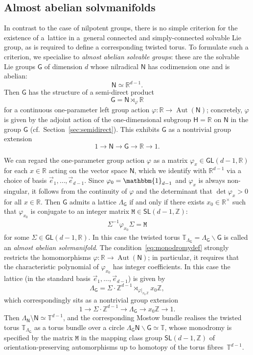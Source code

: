 \documentclass[10pt,a4paper]{amsart}
\numberwithin{equation}{section}
\newcommand{\unit}{\mathbbm{1}} 			%
\newcommand{\sfG}{\mathsf{G}}
\newcommand{\sfH}{\mathsf{H}}
\newcommand{\sfN}{\mathsf{N}}
\newcommand{\sfGL}{\mathsf{GL}}
\newcommand{\sfSL}{\mathsf{SL}}
\newcommand{\ttM}{\mathtt{M}}
\newcommand{\Aut}{\operatorname{Aut}}
\newcommand{\R}{\real}
\newcommand{\zed}{{\mathbb Z}} %
\newcommand{\real}{{\mathbb R}} %
\newcommand{\torus}{{\mathbb T}} %
\begin{document}
\subsection{Almost abelian solvmanifolds}\label{sec:abeliansolv}

In contrast to the case of nilpotent groups, there is no
simple criterion for the existence of a~lattice in a~general
connected and simply-connected solvable Lie group, as is required to define a corresponding twisted
torus. To formulate such a criterion, we specialise to \emph{almost
abelian solvable groups}: these are the solvable Lie groups $\sfG$ of
dimension $d$
whose nilradical $\sfN$ has codimension one and is abelian:
\[
\sfN \simeq \real^{d-1} .
\]
Then $\sfG$ has the
structure of a semi-direct product
\[
\sfG = \sfN\rtimes_\varphi\real
\]
for a continuous one-parameter left group action
$\varphi\colon \real\to\Aut(\sfN)$; concretely, $\varphi$ is given by the
adjoint action of the one-dimensional subgroup $\sfH=\real$ on $\sfN$
in the group $\sfG$ (cf.~Section~\ref{sec:semidirect}). This exhibits
$\sfG$ as a nontrivial group extension
\[
1\longrightarrow \sfN \longrightarrow \sfG \longrightarrow \R \longrightarrow 1 .
\]

We can regard the one-parameter group action $\varphi$ as a matrix
$\varphi_x\in\sfGL(d-1,\real)$ for each $x\in\real$ acting on the
vector space $\sfN$, which we identify with $\real^{d-1}$ via a choice
of basis $\vec e_1,\ldots,\vec e_{d-1}$. Since
$\varphi_{0}=\unit_{d-1}$ and $\varphi_x$ is always non-singular, it
follows from the continuity of $\varphi$ and the determinant that
$\det\varphi_x>0$ for all $x\in\real$. Then $\sfG$ admits a lattice
$\Lambda_\sfG$ if and
only if there exists $x_0\in\real^\times$ such that $\varphi_{x_0}$ is
conjugate to an integer matrix $\ttM\in\sfSL(d-1,\zed)$:
\begin{gather}\label{eq:monodromydef}
\Sigma^{-1} \varphi_{x_0} \Sigma=\ttM
\end{gather}
for some
$\Sigma\in\sfGL(d-1,\real)$.
In this case the twisted torus
$\torus_{\Lambda_\sfG}=\Lambda_{\sfG}\backslash \sfG$ is called an {\emph{almost abelian solvmanifold}}.
The condition~\eqref{eq:monodromydef} strongly restricts the homomorphisms
$\varphi\colon \real\to\Aut(\sfN)$; in particular, it requires that the
characteristic polynomial of $\varphi_{x_0}$ has integer
coefficients. In this case the lattice (in the standard basis $\vec
e_1,\ldots,\vec e_{d-1}$) is given by
\[%
\Lambda_\sfG = \Sigma\cdot\zed^{d-1}\rtimes_{\varphi|_{x_0\,\zed}}
x_0 \zed ,
\]
which correspondingly sits as a nontrivial group extension
\[
1\longrightarrow \Sigma \cdot \zed^{d-1} \longrightarrow \Lambda_\sfG
\longrightarrow x_0 \zed \longrightarrow 1 .
\]
Then $\Lambda_{\sfN}\setminus\sfN\simeq\torus^{d-1}$, and the corresponding Mostow bundle realises the twisted torus
$\torus_{\Lambda_\sfG}$ as a torus bundle over a circle
$\Lambda_\sfG \sfN\backslash\sfG \simeq \torus$, whose monodromy
is specified by the matrix $\ttM$ in the mapping class group $\sfSL(d-1,\zed)$ of
orientation-preserving
automorphisms up to homotopy of the torus fibres~$\torus^{d-1}$.
\end{document}
